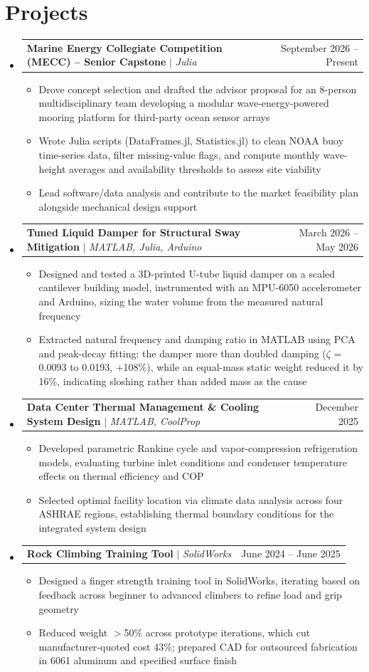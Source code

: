 \documentclass[letterpaper,11pt]{article}
\makeatletter
\newcommand{\resumeItem}[1]{
  \item\small{
    {#1 \vspace{-2pt}}
  }
}
\newcommand{\resumeProjectHeading}[2]{
    \item
    \begin{tabular*}{0.97\textwidth}{l@{\extracolsep{\fill}}r}
      \small#1 & #2 \\
    \end{tabular*}\vspace{-7pt}
}
\newcommand{\resumeSubHeadingListStart}{\begin{itemize}[leftmargin=0.15in, label={}]}
\newcommand{\resumeSubHeadingListEnd}{\end{itemize}}
\newcommand{\resumeItemListStart}{\begin{itemize}}
\newcommand{\resumeItemListEnd}{\end{itemize}\vspace{-5pt}}
\makeatother
\begin{document}
\section{Projects}
    \resumeSubHeadingListStart
      \resumeProjectHeading
          {\textbf{Marine Energy Collegiate Competition (MECC) -- Senior Capstone} $|$ \emph{Julia}}{September 2026 -- Present}
          \resumeItemListStart
            \resumeItem{Drove concept selection and drafted the advisor proposal for an 8-person multidisciplinary team developing a modular wave-energy-powered mooring platform for third-party ocean sensor arrays}
            \resumeItem{Wrote Julia scripts (DataFrames.jl, Statistics.jl) to clean NOAA buoy time-series data, filter missing-value flags, and compute monthly wave-height averages and availability thresholds to assess site viability}
            \resumeItem{Lead software/data analysis and contribute to the market feasibility plan alongside mechanical design support}
          \resumeItemListEnd
      \resumeProjectHeading
          {\textbf{Tuned Liquid Damper for Structural Sway Mitigation} $|$ \emph{MATLAB, Julia, Arduino}}{March 2026 -- May 2026}
          \resumeItemListStart
            \resumeItem{Designed and tested a 3D-printed U-tube liquid damper on a scaled cantilever building model, instrumented with an MPU-6050 accelerometer and Arduino, sizing the water volume from the measured natural frequency}
            \resumeItem{Extracted natural frequency and damping ratio in MATLAB using PCA and peak-decay fitting: the damper more than doubled damping ($\zeta$ = 0.0093 to 0.0193, +108\%), while an equal-mass static weight reduced it by 16\%, indicating sloshing rather than added mass as the cause}
          \resumeItemListEnd
      \resumeProjectHeading
          {\textbf{Data Center Thermal Management \& Cooling System Design} $|$ \emph{MATLAB, CoolProp}}{December 2025}
          \resumeItemListStart
            \resumeItem{Developed parametric Rankine cycle and vapor-compression refrigeration models, evaluating turbine inlet conditions and condenser temperature effects on thermal efficiency and COP}
            \resumeItem{Selected optimal facility location via climate data analysis across four ASHRAE regions, establishing thermal boundary conditions for the integrated system design}
          \resumeItemListEnd
      \resumeProjectHeading
          {\textbf{Rock Climbing Training Tool} $|$ \emph{SolidWorks}}{June 2024 -- June 2025}
          \resumeItemListStart
            \resumeItem{Designed a finger strength training tool in SolidWorks, iterating based on feedback across beginner to advanced climbers to refine load and grip geometry}
            \resumeItem{Reduced weight $>$50\% across prototype iterations, which cut manufacturer-quoted cost 43\%; prepared CAD for outsourced fabrication in 6061 aluminum and specified surface finish}
          \resumeItemListEnd
    \resumeSubHeadingListEnd
\end{document}
